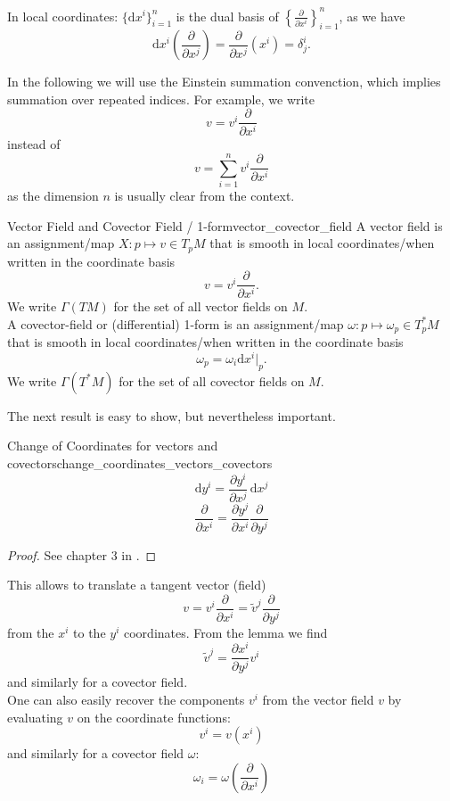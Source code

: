 In local coordinates: $\{\mathrm{d}x^i\}_{i=1}^n$ is the dual basis of $\left\{\frac{\partial}{\partial x^i}\right\}_{i=1}^n$, as we have
\[
\mathrm{d}x^i \left( \frac{\partial}{\partial x^j} \right) = \frac{\partial}{\partial x^j} (x^i) = \delta_j^i.
\]

In the following we will use the Einstein summation convenction, which implies summation over repeated indices. For example, we write
\[v = v^i \frac{\partial}{\partial x^i}
\]instead of
\[v = \sum_{i=1}^n v^i \frac{\partial}{\partial x^i}
\]
as the dimension $n$ is usually clear from the context.


\begin{colordef}{Vector Field and Covector Field / 1-form}{vector_covector_field}
A vector field is an assignment/map $X:p \mapsto v \in T_pM$ that is smooth in local coordinates/when written in the coordinate basis
\[
v = v^i \frac{\partial}{\partial x^i}.
\]
We write $\Gamma(TM)$ for the set of all vector fields on $M$.\\

A covector-field or (differential) 1-form is an assignment/map $\omega:p \mapsto \omega_p \in T_p^*M$ that is smooth in local coordinates/when written in the coordinate basis
\[
\omega_p = \omega_i \mathrm{d}x^i|_p.
\]
We write $\Gamma(T^*M)$ for the set of all covector fields on $M$.
\end{colordef}

The next result is easy to show, but nevertheless important.

\begin{colorlem}{Change of Coordinates for vectors and covectors}{change_coordinates_vectors_covectors}
\[
\mathrm{d}y^i = \frac{\partial y^i}{\partial x^j} \, \mathrm{d}x^j
\]
\[
\frac{\partial}{\partial x^i} = \frac{\partial y^j}{\partial x^i} \frac{\partial}{\partial y^j}
\]
\end{colorlem}
\begin{proof}
See chapter 3 in \cite{tsakanikas2024dg2}.
\end{proof}


\begin{colremark}
This allows to translate a tangent vector (field)
$$v=v^i \frac{\partial}{\partial x^i}=\tilde v^j \frac{\partial}{\partial y^j}$$
from the $x^i$ to the $y^i$ coordinates. From the lemma we find
$$\tilde v^j = \frac{\partial x^i}{\partial y^j} v^i$$
and similarly for a covector field.\\
One can also easily recover the components $v^i$ from the vector field $v$ by evaluating $v$ on the coordinate functions:
$$v^i = v(x^i)$$
and similarly for a covector field $\omega$:
$$\omega_i = \omega\left(\frac{\partial}{\partial x^i}\right)$$ 
\end{colremark}

